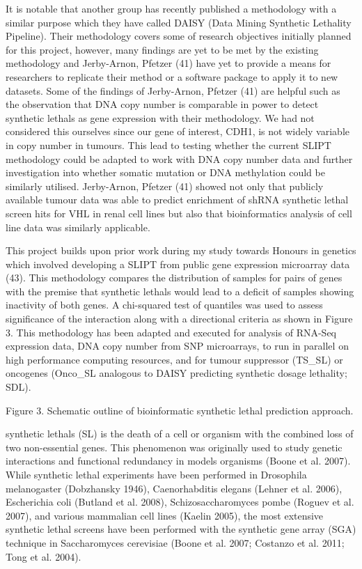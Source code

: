It is notable that another group has recently published a methodology with a similar purpose which they have called \gls{DAISY} (Data Mining Synthetic Lethality Pipeline). Their methodology covers some of research objectives initially planned for this project, however, many findings are yet to be met by the existing methodology and Jerby-Arnon, Pfetzer (41) have yet to provide a means for researchers to replicate their method or a software package to apply it to new datasets. Some of the findings of Jerby-Arnon, Pfetzer (41) are helpful such as the observation that DNA copy number is comparable in power to detect \glspl{synthetic lethal} as gene expression with their methodology. We had not considered this ourselves since our gene of interest, CDH1, is not widely variable in copy number in tumours. This lead to testing whether the current SLIPT methodology could be adapted to work with DNA copy number data and further investigation into whether somatic mutation or DNA methylation could be similarly utilised. Jerby-Arnon, Pfetzer (41) showed not only that publicly available tumour data was able to predict enrichment of shRNA \gls{synthetic lethal} screen hits for VHL in renal cell lines but also that \gls{bioinformatics} analysis of cell line data was similarly applicable.

This project builds upon prior work during my study towards Honours in genetics which involved developing a \gls{SLIPT} from public gene expression microarray data (43). This methodology compares the distribution of samples for pairs of genes with the premise that \glspl{synthetic lethal} would lead to a deficit of samples showing inactivity of both genes. A chi-squared test of quantiles was used to assess significance of the interaction along with a directional criteria as shown in Figure 3. This methodology has been adapted and executed for analysis of \gls{RNA-Seq} expression data, DNA copy number from SNP microarrays, to run in parallel on high performance computing resources, and for tumour suppressor (TS\_SL) or oncogenes (Onco\_SL analogous to \gls{DAISY} predicting synthetic dosage lethality; SDL).

Figure 3. Schematic outline of bioinformatic \gls{synthetic lethal} prediction approach.


\Glspl{synthetic lethal} (SL) is the death of a cell or organism with the combined loss of two non-essential genes.   This phenomenon was originally used to study genetic interactions and functional redundancy in models organisms (Boone et al. 2007).   While \gls{synthetic lethal} experiments have been performed in Drosophila melanogaster (Dobzhansky 1946), Caenorhabditis elegans (Lehner et al. 2006), Escherichia coli (Butland et al. 2008), Schizosaccharomyces pombe (Roguev et al. 2007), and various mammalian cell lines (Kaelin 2005), the most extensive \gls{synthetic lethal} screens have been performed with the synthetic gene array (SGA) technique in Saccharomyces cerevisiae (Boone et al. 2007; Costanzo et al. 2011; Tong et al. 2004).  

